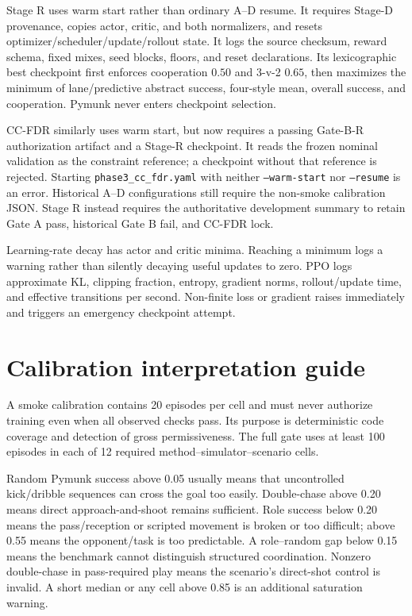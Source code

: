 \documentclass[12pt,twocolumn]{article}
\begin{document}
Stage R uses warm start rather than ordinary A--D resume. It requires Stage-D provenance, copies
actor, critic, and both normalizers, and resets optimizer/scheduler/update/rollout state. It logs
the source checksum, reward schema, fixed mixes, seed blocks, floors, and reset declarations.
Its lexicographic best checkpoint first enforces cooperation \(0.50\) and 3-v-2 \(0.65\), then
maximizes the minimum of lane/predictive abstract success, four-style mean, overall success, and
cooperation. Pymunk never enters checkpoint selection.

CC-FDR similarly uses warm start, but now requires a passing Gate-B-R authorization artifact and
a Stage-R checkpoint. It reads the frozen nominal validation as the constraint reference; a
checkpoint without that reference is rejected. Starting
\texttt{phase3\_cc\_fdr.yaml} with neither \texttt{--warm-start} nor \texttt{--resume} is an error.
Historical A--D configurations still require the non-smoke calibration JSON. Stage R instead
requires the authoritative development summary to retain Gate A pass, historical Gate B fail,
and CC-FDR lock.

Learning-rate decay has actor and critic minima. Reaching a minimum logs a warning rather than
silently decaying useful updates to zero. PPO logs approximate KL, clipping fraction, entropy,
gradient norms, rollout/update time, and effective transitions per second. Non-finite loss or
gradient raises immediately and triggers an emergency checkpoint attempt.

\section{Calibration interpretation guide}
A smoke calibration contains 20 episodes per cell and must never authorize training even when all
observed checks pass. Its purpose is deterministic code coverage and detection of gross
permissiveness. The full gate uses at least 100 episodes in each of 12 required
method--simulator--scenario cells.

Random Pymunk success above 0.05 usually means that uncontrolled kick/dribble sequences can cross
the goal too easily. Double-chase above 0.20 means direct approach-and-shoot remains sufficient.
Role success below 0.20 means the pass/reception or scripted movement is broken or too difficult;
above 0.55 means the opponent/task is too predictable. A role--random gap below 0.15 means the
benchmark cannot distinguish structured coordination. Nonzero double-chase in pass-required play
means the scenario's direct-shot control is invalid. A short median or any cell above 0.85 is an
additional saturation warning.
\end{document}
